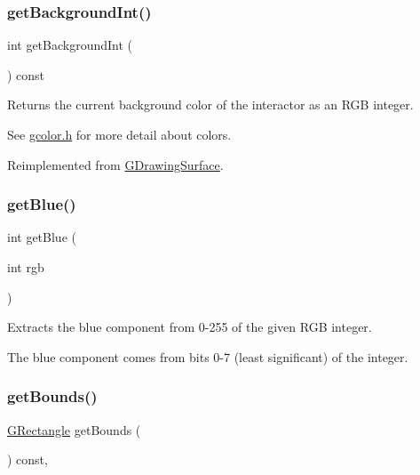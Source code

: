 \subsubsection{\texorpdfstring{get\+Background\+Int()}{getBackgroundInt()}}
{\footnotesize\ttfamily int get\+Background\+Int (\begin{DoxyParamCaption}{ }\end{DoxyParamCaption}) const\hspace{0.3cm}{\ttfamily [virtual]}}



Returns the current background color of the interactor as an R\+GB integer. 

See \mbox{\hyperlink{gcolor_8h_source}{gcolor.\+h}} for more detail about colors. 

Reimplemented from \mbox{\hyperlink{classGDrawingSurface_a9e827257a55cb8cf4d9de2ec6bcfd7a0}{G\+Drawing\+Surface}}.

\mbox{\label{classGCanvas_a9406c01e6961257db37b5dc95945f914}} 
\subsubsection{\texorpdfstring{get\+Blue()}{getBlue()}}
{\footnotesize\ttfamily int get\+Blue (\begin{DoxyParamCaption}\item[{int}]{rgb }\end{DoxyParamCaption})\hspace{0.3cm}{\ttfamily [static]}}



Extracts the blue component from 0-\/255 of the given R\+GB integer. 

The blue component comes from bits 0-\/7 (least significant) of the integer. \mbox{\label{classGInteractor_a29e6ac35a0b48f491a4c88194cc5da3b}} 
\subsubsection{\texorpdfstring{get\+Bounds()}{getBounds()}}
{\footnotesize\ttfamily \mbox{\hyperlink{classGRectangle}{G\+Rectangle}} get\+Bounds (\begin{DoxyParamCaption}{ }\end{DoxyParamCaption}) const\hspace{0.3cm}{\ttfamily [virtual]}, {\ttfamily [inherited]}}



